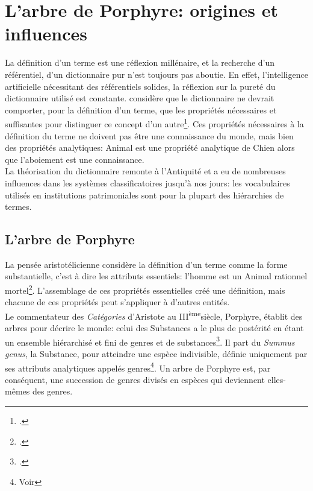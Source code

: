 \section{\label{I-C-1}L'arbre de Porphyre: origines et influences}

La définition d'un terme est une réflexion millénaire, et la recherche d'un référentiel, d'un dictionnaire pur n'est toujours pas aboutie. En effet, l'intelligence artificielle nécessitant des référentiels solides, la réflexion sur la pureté du dictionnaire utilisé est constante.  considère que le dictionnaire \og ne devrait comporter, pour la définition d'un  terme, que les propriétés nécessaires et suffisantes pour distinguer ce concept d'un autre\fg\footcite[chap.1]{eco_arbre_2010}. Ces propriétés nécessaires à la définition du terme ne doivent pas être une connaissance du monde, mais bien des propriétés analytiques: \og Animal\fg{} est une propriété analytique de \og Chien\fg{} alors que l'aboiement est une connaissance.\\

La théorisation du dictionnaire remonte à l'Antiquité et a eu de nombreuses influences dans les systèmes classificatoires jusqu'à nos jours: les vocabulaires utilisés en institutions patrimoniales sont pour la plupart des hiérarchies de termes.

\subsection{\label{I-C-1-a}L'arbre de Porphyre}

La pensée aristotélicienne considère la définition d'un terme comme la forme substantielle, c'est à dire les attributs essentiels: l'\og homme\fg{} est un \og Animal rationnel mortel\fg{}\footcite[chap.1]{eco_arbre_2010}. L'assemblage de ces propriétés essentielles créé une définition, mais chacune de ces propriétés peut s'appliquer à d'autres entités. \\

Le commentateur des \textit{Catégories} d'Aristote au \textsc{III}\textsuperscript{ème}siècle, Porphyre, établit des arbres pour décrire le monde: celui des \og Substances\fg{} a le plus de postérité en étant \og un ensemble hiérarchisé et fini de genres et de substances\fg{}\footcite[chap.1]{eco_arbre_2010}. Il part du \textit{Summus genus}, la Substance, pour atteindre une espèce indivisible, définie uniquement par ses attributs analytiques appelés genres\footnote{Voir }. Un arbre de Porphyre est, par conséquent, une succession de genres divisés en espèces qui deviennent elles-mêmes des genres.\\

